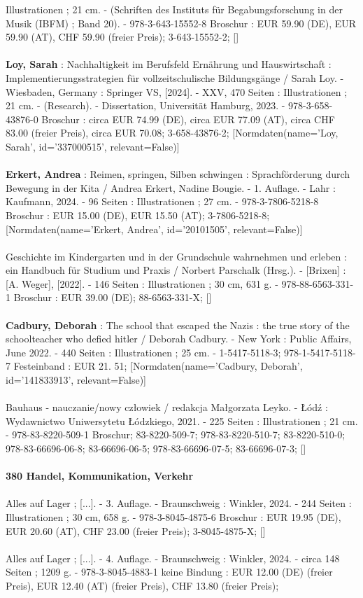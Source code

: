 \documentclass{article}
\begin{document}
\begin{multicols}{3}
Illustrationen ; 21 cm. - (Schriften des Instituts für Begabungsforschung in der Musik (IBFM) ; Band 20). - 978-3-643-15552-8 Broschur : EUR 59.90 (DE), EUR 59.90 (AT), CHF 59.90 (freier Preis); 3-643-15552-2; []\\\\\textbf{Loy, Sarah} : Nachhaltigkeit im Berufsfeld Ernährung und Hauswirtschaft : Implementierungsstrategien für vollzeitschulische Bildungsgänge / Sarah Loy. - Wiesbaden, Germany : Springer VS, [2024]. - XXV, 470 Seiten : Illustrationen ; 21 cm. - (Research). - Dissertation, Universität Hamburg, 2023. - 978-3-658-43876-0 Broschur : circa EUR 74.99 (DE), circa EUR 77.09 (AT), circa CHF 83.00 (freier Preis), circa EUR 70.08; 3-658-43876-2; [Normdaten(name='Loy, Sarah', id='337000515', relevant=False)]\\\\\textbf{Erkert, Andrea} : Reimen, springen, Silben schwingen : Sprachförderung durch Bewegung in der Kita / Andrea Erkert, Nadine Bougie. - 1. Auflage. - Lahr : Kaufmann, 2024. - 96 Seiten : Illustrationen ; 27 cm. - 978-3-7806-5218-8 Broschur : EUR 15.00 (DE), EUR 15.50 (AT); 3-7806-5218-8; [Normdaten(name='Erkert, Andrea', id='20101505', relevant=False)]\\\\Geschichte im Kindergarten und in der Grundschule wahrnehmen und erleben : ein Handbuch für Studium und Praxis / Norbert Parschalk (Hrsg.). - [Brixen] :  [A. Weger], [2022]. - 146 Seiten : Illustrationen ; 30 cm, 631 g. - 978-88-6563-331-1 Broschur : EUR 39.00 (DE); 88-6563-331-X; []\\\\\textbf{Cadbury, Deborah} : The school that escaped the Nazis : the true story of the schoolteacher who defied hitler / Deborah Cadbury. - New York : Public Affairs, June 2022. - 440 Seiten : Illustrationen ; 25 cm. - 1-5417-5118-3; 978-1-5417-5118-7 Festeinband : EUR 21. 51; [Normdaten(name='Cadbury, Deborah', id='141833913', relevant=False)]\\\\Bauhaus - nauczanie/nowy człowiek / redakcja Małgorzata Leyko. - Łódź : Wydawnictwo Uniwersytetu Łódzkiego, 2021. - 225 Seiten : Illustrationen ; 21 cm. - 978-83-8220-509-1 Broschur; 83-8220-509-7; 978-83-8220-510-7; 83-8220-510-0; 978-83-66696-06-8; 83-66696-06-5; 978-83-66696-07-5; 83-66696-07-3; []\\\\\textbf{380 Handel, Kommunikation, Verkehr}\\\\Alles auf Lager ; [...]. - 3. Auflage. - Braunschweig : Winkler, 2024. - 244 Seiten : Illustrationen ; 30 cm, 658 g. - 978-3-8045-4875-6 Broschur : EUR 19.95 (DE), EUR 20.60 (AT), CHF 23.00 (freier Preis); 3-8045-4875-X; []\\\\Alles auf Lager ; [...]. - 4. Auflage. - Braunschweig : Winkler, 2024. - circa 148 Seiten ; 1209 g. - 978-3-8045-4883-1 keine Bindung : EUR 12.00 (DE) (freier Preis), EUR 12.40 (AT) (freier Preis), CHF 13.80 (freier Preis); 
\end{multicols}
\end{document}
